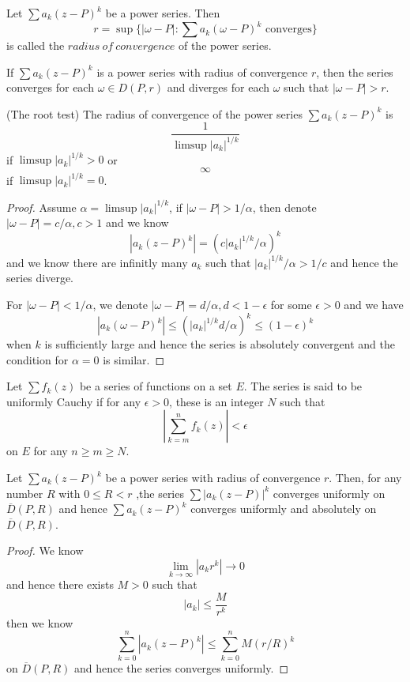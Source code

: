 \begin{definition}
    Let $\sum a_k(z-P)^k$ be a power series. Then
    \[r = \sup\{|\omega-P|:\sum a_k(\omega-P)^k\text{ converges}\}\]
    is called the $radius\ of\ convergence$ of the power series.
\end{definition}

\begin{lemma}
    If $\sum a_k(z-P)^k$ is a power series with radius of convergence $r$, then the series converges for each $\omega \in D({P,r})$ and diverges for each $\omega$ such that $|\omega-P|>r$.
\end{lemma}

\begin{lemma}
    (The root test) The radius of convergence of the power series $\sum a_k(z-P)^k$ is
    \[\dfrac{1}{\limsup |a_k|^{1/k}}\]
    if $\limsup |a_k|^{1/k} > 0$ or
    \[\infty\]
    if $\limsup |a_k|^{1/k} = 0$.
\end{lemma}
\begin{proof}\par
    Assume $\alpha = \limsup |a_k|^{1/k}$, if $|\omega-P|>1/\alpha$, then denote $|\omega-P| = c/\alpha,c>1$ and we know
    \[
    |a_k(z-P)^k| = (c|a_k|^{1/k}/\alpha)^k
    \]    
    and we know there are infinitly many $a_k$ such that $|a_k|^{1/k}/\alpha > 1/c$ and hence the series diverge.\par
    For $|\omega-P|<1/\alpha$, we denote $|\omega-P| = d/\alpha, d<1-\epsilon$ for some $\epsilon >0$ and we have
    \[
    |a_k(\omega-P)^k| \leq (|a_k|^{1/k}d/\alpha)^k \leq (1-\epsilon)^k 
    \]
    when $k$ is sufficiently large and hence the series is absolutely convergent and the condition for $\alpha = 0$ is similar.
\end{proof}

\begin{definition}
    Let $\sum f_k(z)$ be a series of functions on a set $E$. The series is said to be uniformly Cauchy if for any $\epsilon > 0$, these is an integer $N$ such that
    \[
    |\sum\limits_{k=m}^{n} f_k(z)| <\epsilon
    \]
    on $E$ for any $n\geq m \geq N$.
\end{definition}

\begin{proposition}
    Let $\sum a_k(z-P)^k$ be a power series with radius of convergence $r$. Then, for any number $R$ with $0 \leq R < r$ ,the series $\sum |a_k(z-P)|^k$ converges uniformly on $\overline{D}(P,R)$ and hence $\sum a_k(z-P)^k$ converges uniformly and absolutely on $\overline{D}(P,R)$.
\end{proposition}
\begin{proof}
    We know
    \[\lim_{k\to\infty}|a_kr^k| \to 0\]
    and hence there exists $M>0$ such that
    \[|a_k| \leq \dfrac{M}{r^k}\]
    then we know
    \[
    \sum\limits_{k=0}^{n}|a_k(z-P)^k| \leq \sum\limits_{k=0}^n M(r/R)^k
    \]
    on $\overline{D}(P,R)$ and hence the series converges uniformly.
\end{proof}

